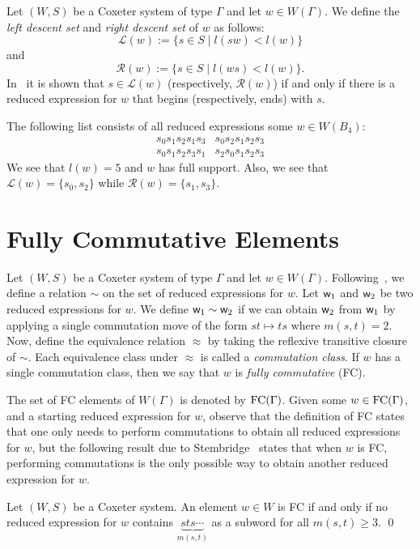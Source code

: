 Let $(W,S)$ be a Coxeter system of type $\Gamma$ and let $w \in W(\Gamma)$. We define the \emph{left descent set} and \emph{right descent set} of $w$ as follows:
\[\mathcal{L}(w):=\{s \in S \mid l(sw) < l(w)\}\]
and
\[\mathcal{R}(w):=\{s \in S \mid l(ws) < l(w)\}.\]
In~\cite{Bjorner2005} it is shown that $s \in \mathcal{L}(w)$ (respectively, $\mathcal{R}(w)$) if and only if there is a reduced expression for $w$ that begins (respectively, ends) with $s$.

\begin{example}
The following list consists of all reduced expressions some $w \in W(B_4)$:
$$\begin{array}{ll}
s_0s_1s_2s_1s_3 & s_0s_2s_1s_2s_3\\
s_0s_1s_2s_3s_1 & s_2s_0s_1s_2s_3	
\end{array}$$
We see that $l(w)=5$ and $w$ has full support. Also, we see that $\mathcal{L}(w)=\{s_0, s_2\}$ while $\mathcal{R}(w)=\{s_1, s_3\}$.	
\end{example}



\section{Fully Commutative Elements}\label{sec:FC}
Let $(W,S)$ be a Coxeter system of type $\Gamma$ and let $w \in W(\Gamma)$. Following~\cite{Stembridge1996}, we define a relation $\sim$ on the set of reduced expressions for $w$. Let $\mathsf{w}_1$ and $\mathsf{w}_2$ be two reduced expressions for $w$. We define $\mathsf{w}_1 \sim \mathsf{w}_2$ if we can obtain $\mathsf{w}_2$ from $\mathsf{w}_1$ by applying a single commutation move of the form $st \mapsto ts$ where $m(s,t)=2$. Now, define the equivalence relation $\approx$ by taking the reflexive transitive closure of $\sim$. Each equivalence class under $\approx$ is called a \emph{commutation class}. If $w$ has a single commutation class, then we say that $w$ is \emph{fully commutative} (FC). 

The set of FC elements of $W(\Gamma)$ is denoted by $\mathrm{FC}(\Gamma)$. Given some $w \in \mathrm{FC}(\Gamma)$, and a starting reduced expression for $w$, observe that the definition of FC states that one only needs to perform commutations to obtain all reduced expressions for $w$, but the following result due to Stembridge~\cite{Stembridge1996} states that when $w$ is FC, performing commutations is the only possible way to obtain another reduced expression for $w$.

\begin{theorem}\label{thm:Stembridge}
	Let $(W,S)$ be a Coxeter system. An element $w \in W$ is FC if and only if no reduced expression for $w$ contains $\underbrace{sts\cdots}_{m(s,t)}$ as a subword for all $m(s,t) \geq 3$. \qed
\end{theorem}

